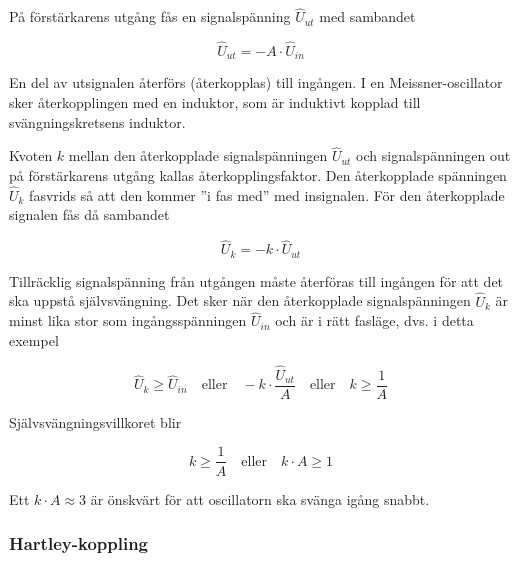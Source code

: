 På förstärkarens utgång fås en signalspänning \(\hat{U}_{ut}\) med sambandet

\[\hat{U}_{ut} = -A \cdot \hat{U}_{in}\]

En del av utsignalen återförs (återkopplas) till ingången.
I en Meissner-oscillator sker återkopplingen med en induktor, som är
induktivt kopplad till svängningskretsens induktor.

Kvoten \(k\) mellan den återkopplade signalspänningen \(\hat{U}_{ut}\) och
signalspänningen out på förstärkarens utgång kallas återkopplingsfaktor.
Den återkopplade spänningen \(\hat{U}_k\) fasvrids så att den kommer
''i fas med'' med insignalen.
För den återkopplade signalen fås då sambandet

\[\hat{U}_k = -k \cdot \hat{U}_{ut}\]

Tillräcklig signalspänning från utgången måste återföras till ingången
för att det ska uppstå självsvängning.
Det sker när den återkopplade signalspänningen \(\hat{U}_k\) är minst lika stor
som ingångsspänningen \(\hat{U}_{in}\) och är i rätt fasläge, dvs. i
detta exempel

\[
\hat{U}_k \geq \hat{U}_{in}
\quad \text{eller} \quad
-k \cdot \frac{\hat{U}_{ut}}{A}
\quad \text{eller} \quad
k \geq \frac{1}{A}
\]

Självsvängningsvillkoret blir

\[
k \geq \frac{1}{A}
\quad \text{eller} \quad
k \cdot A \geq 1
\]

Ett \(k \cdot A \approx 3\) är önskvärt för att oscillatorn ska svänga igång
snabbt.

\subsubsection{Hartley-koppling}

